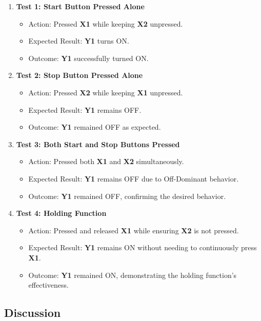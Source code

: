 \documentclass[12pt]{article}
\begin{document}
\begin{enumerate}
    \item \textbf{Test 1: Start Button Pressed Alone}
    \begin{itemize}
        \item Action: Pressed \textbf{X1} while keeping \textbf{X2} unpressed.
        \item Expected Result: \textbf{Y1} turns ON.
        \item Outcome: \textbf{Y1} successfully turned ON.
    \end{itemize}
    
    \item \textbf{Test 2: Stop Button Pressed Alone}
    \begin{itemize}
        \item Action: Pressed \textbf{X2} while keeping \textbf{X1} unpressed.
        \item Expected Result: \textbf{Y1} remains OFF.
        \item Outcome: \textbf{Y1} remained OFF as expected.
    \end{itemize}
    
    \item \textbf{Test 3: Both Start and Stop Buttons Pressed}
    \begin{itemize}
        \item Action: Pressed both \textbf{X1} and \textbf{X2} simultaneously.
        \item Expected Result: \textbf{Y1} remains OFF due to Off-Dominant behavior.
        \item Outcome: \textbf{Y1} remained OFF, confirming the desired behavior.
    \end{itemize}
    
    \item \textbf{Test 4: Holding Function}
    \begin{itemize}
        \item Action: Pressed and released \textbf{X1} while ensuring \textbf{X2} is not pressed.
        \item Expected Result: \textbf{Y1} remains ON without needing to continuously press \textbf{X1}.
        \item Outcome: \textbf{Y1} remained ON, demonstrating the holding function's effectiveness.
    \end{itemize}
\end{enumerate}

\subsection{Discussion}
\end{document}
